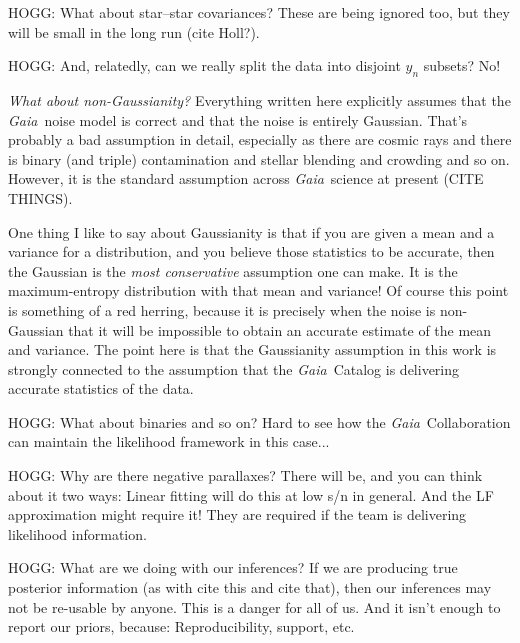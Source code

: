 \documentclass[12pt, modern]{aastex62}
\newcommand{\Gaia}{\textsl{Gaia}}
\begin{document}
HOGG: What about star--star covariances? These are being ignored too, but they
will be small in the long run (cite Holl?).

HOGG: And, relatedly, can we really split the data into disjoint $y_n$ subsets?
No!

\emph{What about non-Gaussianity?} Everything written here
 explicitly assumes that the \Gaia\ noise
model is correct and that the noise is entirely Gaussian.
That's probably a bad assumption in detail,
especially as there are cosmic rays and there is binary (and triple)
contamination and stellar blending and crowding and so on.
However, it is the standard assumption across \Gaia\ science at present (CITE THINGS).

One thing I like to say about Gaussianity is that if you are given a mean
and a variance for a distribution, and you believe those statistics to be
accurate, then the Gaussian is the \emph{most conservative} assumption one
can make.
It is the maximum-entropy distribution with that mean and variance!
Of course this point is something of a red herring, because it is precisely
when the noise is non-Gaussian that it will be impossible to obtain an
accurate estimate of the mean and variance.
The point here is that the Gaussianity assumption in this work is strongly connected
to the assumption that the \Gaia\ Catalog is delivering accurate statistics of
the data.

HOGG: What about binaries and so on? Hard to see how the \Gaia\ Collaboration can
maintain the likelihood framework in this case...

HOGG: Why are there negative parallaxes? There will be, and you can think about
it two ways: Linear fitting will do this at low s/n in general. And the
LF approximation might require it!
They are required if the team is delivering likelihood information.

HOGG: What are we doing with our inferences? If we are producing true posterior
information (as with cite this and cite that), then our inferences may not
be re-usable by anyone. This is a danger for all of us. And it isn't enough
to report our priors, because: Reproducibility, support, etc.
\end{document}
